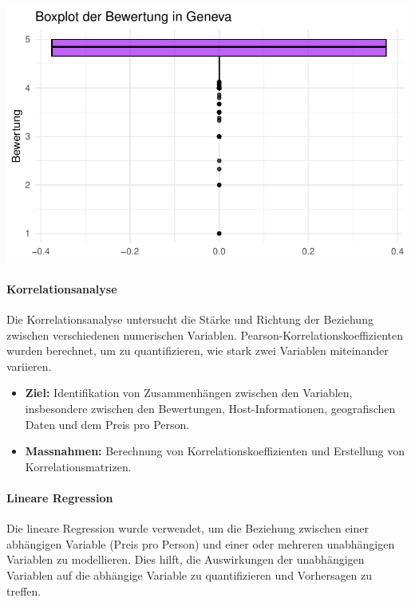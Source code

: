 \documentclass[
  journal,
]{IEEEtran}%
\let\oldparagraph\paragraph
\renewcommand{\paragraph}[1]{\oldparagraph{#1}\mbox{}}
\begin{document}
\includegraphics{main_files/figure-pdf/descriptive geneva-4.pdf}

\hypertarget{korrelationsanalyse}{%
\paragraph{\texorpdfstring{\textbf{Korrelationsanalyse}}{Korrelationsanalyse}}\label{korrelationsanalyse}}

Die Korrelationsanalyse untersucht die Stärke und Richtung der Beziehung
zwischen verschiedenen numerischen Variablen.
Pearson-Korrelationskoeffizienten wurden berechnet, um zu
quantifizieren, wie stark zwei Variablen miteinander variieren.

\begin{itemize}
\item
  \textbf{Ziel:} Identifikation von Zusammenhängen zwischen den
  Variablen, insbesondere zwischen den Bewertungen, Host-Informationen,
  geografischen Daten und dem Preis pro Person.
\item
  \textbf{Massnahmen:} Berechnung von Korrelationskoeffizienten und
  Erstellung von Korrelationsmatrizen.
\end{itemize}

\hypertarget{lineare-regression}{%
\paragraph{\texorpdfstring{\textbf{Lineare
Regression}}{Lineare Regression}}\label{lineare-regression}}

Die lineare Regression wurde verwendet, um die Beziehung zwischen einer
abhängigen Variable (Preis pro Person) und einer oder mehreren
unabhängigen Variablen zu modellieren. Dies hilft, die Auswirkungen der
unabhängigen Variablen auf die abhängige Variable zu quantifizieren und
Vorhersagen zu treffen.
\end{document}
